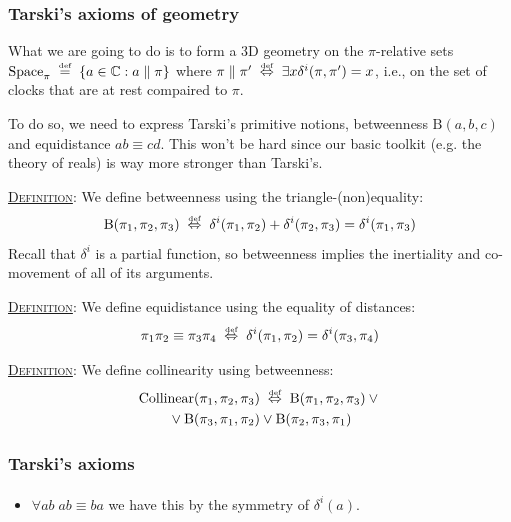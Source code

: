 \documentclass[xcolor=x11names]{beamer}
\newcommand{\dzsa}[1]{\textsc{\underline{#1}}:}
\newcommand{\Between}{\mathrm{B}}
\newcommand{\EqDist}{\equiv}
\newcommand{\defegy}[1][.1]{\hspace{#1cm}\overset{\textup{\tiny def}}{=}\hspace{#1cm}}
\newcommand{\defekv}[1][.1]{\hspace{#1cm}\overset{\textup{\tiny def}}{ \Leftrightarrow }\hspace{#1cm}}
\begin{document}
\begin{frame}
\frametitle{Tarski's axioms of geometry}
\footnotesize

What we are going to do is to form a 3D geometry on the $\pi$-relative sets $\mathrm{Space}_\pi \defegy \{ a \in \mathbb C  : a\parallel \pi \}$ where $\pi\parallel \pi'\defekv \exists x \delta^i(\pi, \pi')=x$, i.e., on the set of clocks that are at rest compaired to $\pi$.

To do so, we need to express Tarski's primitive notions, betweenness $\Between(a,b,c)$ and equidistance $ab\EqDist cd$. This won't be hard since our basic toolkit (e.g. the theory of reals) is way more stronger than Tarski's.

\dzsa{Definition} We define betweenness using the triangle-(non)equality:
\[ \Between(\pi_1, \pi_2, \pi_3) \defekv \delta^i(\pi_1, \pi_2) + \delta^i(\pi_2, \pi_3) = \delta^i(\pi_1, \pi_3) \]
Recall that $\delta^i$ is a partial function, so betweenness implies the inertiality and co-movement of all of its arguments.

\bigskip

\dzsa{Definition} We define equidistance using the equality of distances:
\[ \pi_1\pi_2 \EqDist  \pi_3\pi_4 \defekv \delta^i(\pi_1, \pi_2) = \delta^i(\pi_3, \pi_4)\]

\bigskip

\dzsa{Definition} We define collinearity using betweenness:
\begin{multline*} \mathrm{Collinear}(\pi_1, \pi_2, \pi_3) \defekv \Between(\pi_1, \pi_2, \pi_3) \lor {}\\{}\lor \Between(\pi_3, \pi_1, \pi_2) \lor \Between(\pi_2, \pi_3, \pi_1)\end{multline*}

\end{frame}


\begin{frame}
\frametitle{Tarski's axioms}
\framesubtitle{}
\footnotesize

\begin{itemize}
\item $\forall ab \; ab\EqDist ba$ we have this by the symmetry of $\delta^i(a)$.
\end{itemize}
\end{frame}
\end{document}
